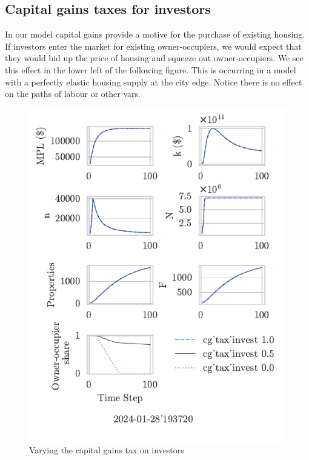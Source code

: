 \newpage %
\subsection{Capital gains taxes for investors}
In our model capital gains provide a motive for the purchase of existing housing. If investors enter the market for existing owner-occupiers, we would expect that they would bid up the price of housing and squeeze out owner-occupiers. We see this effect in the lower left of the following figure. This is occurring in a model with a perfectly elastic housing supply at the city edge. Notice there is no effect on the paths of labour or other vars.
\begin{figure}
    \centering
    \includegraphics{fig/Analysis/cg_tax_invest-[1- 0.5-0.0]_193720.pdf}
    \caption{Varying the capital gains tax on investors}
    \label{fig:enter-label}
\end{figure}

